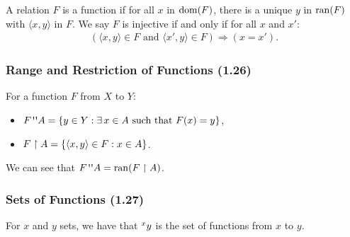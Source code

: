 A relation $F$ is a function if for all $x$ in $\operatorname{dom}(F)$, there is a unique
$y$ in $\operatorname{ran}(F)$ with $\langle x, y \rangle$ in $F$.
We say $F$ is injective if and only if for all $x$ and $x'$:
\begin{align*}
    (\langle x, y \rangle \in F \text{ and } \langle x', y \rangle \in F) 
    \Longrightarrow
    (x = x').
\end{align*} 

\subsubsection{Range and Restriction of Functions (1.26)} \label{1.26}

For a function $F$ from $X$ to $Y$: \begin{itemize}
    \item $F \fran A = \{y \in Y : \exists \, x \in A \text{ such that } F(x) = y\}$,
    \item $F \upharpoonright A = \{{\langle x, y \rangle} \in F : x \in A\}$.
\end{itemize} We can see that $F \fran A = \Ran(F \upharpoonright A)$.

\subsubsection{Sets of Functions (1.27)} \label{1.27}

For $x$ and $y$ sets, we have that ${{}^{x}}y$ is the set of functions from $x$ to $y$.
